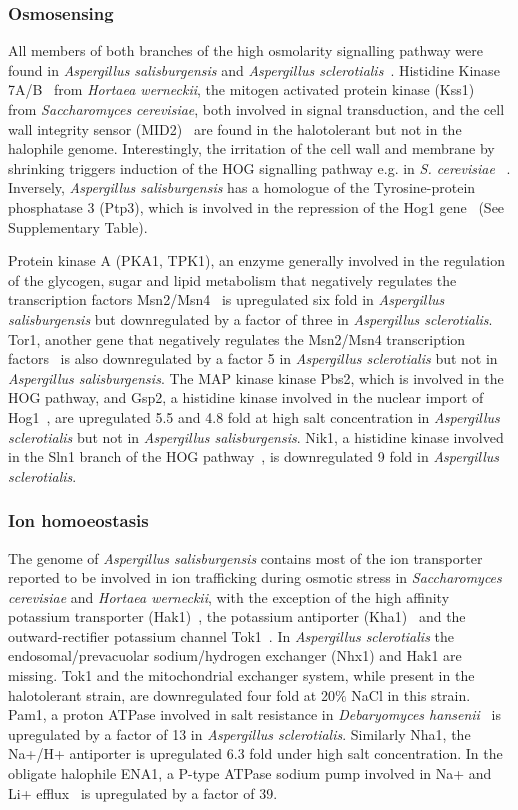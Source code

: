 \documentclass[jof,article,submit,moreauthors,pdftex,10pt,a4paper]{Definitions/mdpi}
\newcommand{\horWer}{\textit{Hortaea werneckii}}
\newcommand{\debHan}{\textit{Debaryomyces hansenii}}
\newcommand{\sacCer}{\textit{Saccharomyces cerevisiae}}
\newcommand{\phiSp}{\textit{Aspergillus salisburgensis}}
\newcommand{\phiScl}{\textit{Aspergillus sclerotialis}}
\begin{document}
\subsubsection{Osmosensing}
All members of both branches of the high osmolarity signalling pathway were found in \phiSp{} and \phiScl{}~\cite{Hohmann2009,Ma2013}. Histidine Kinase 7A/B~\cite{Lenassi2007} from \horWer{}, the mitogen activated protein kinase (Kss1)~\cite{Mortimer1989} from \sacCer{}, both involved in signal transduction,  and the cell wall integrity sensor (MID2)~\cite{Ono1994} are found in the halotolerant but not in the halophile genome. Interestingly, the irritation of the cell wall and membrane by shrinking  triggers induction of the HOG signalling pathway e.g. in \textit{S. cerevisiae} ~\cite{Hohmann2002, Stratford2019}. Inversely, \phiSp{} has a homologue of the  Tyrosine-protein phosphatase 3 (Ptp3), which is involved in the repression of the Hog1 gene~\cite{Wurgler-Murphy1997} (See Supplementary Table).

Protein kinase A (PKA1, TPK1), an enzyme generally involved in the regulation of the glycogen, sugar and lipid metabolism that negatively regulates the transcription factors Msn2/Msn4~\cite{Smith1998} is upregulated six fold in \phiSp{} but downregulated by a factor of three in \phiScl{}. Tor1, another gene that negatively regulates the Msn2/Msn4 transcription factors~\cite{Smith1998} is also downregulated by a factor 5 in \phiScl{} but not in \phiSp{}. The MAP kinase kinase Pbs2, which is involved in the HOG pathway, and Gsp2, a histidine kinase involved in the nuclear import of Hog1~\cite{Ferrigno1998}, are upregulated 5.5 and 4.8 fold at high salt concentration in \phiScl{} but not in \phiSp{}. Nik1, a histidine kinase involved in the Sln1 branch of the HOG pathway~\cite{Kruppa2006}, is downregulated 9 fold in \phiScl{}.

\subsubsection{Ion homoeostasis}
The genome of \phiSp{} contains most of the ion transporter reported to be involved in ion trafficking during osmotic stress in \sacCer{} and \horWer{}, with the exception of the high affinity potassium transporter (Hak1)~\cite{Kruppa2006}, the potassium antiporter (Kha1)~\cite{Plemenitas2014} and the outward-rectifier potassium channel Tok1~\cite{Plemenitas2014}. In \phiScl{} the endosomal/prevacuolar sodium/hydrogen exchanger (Nhx1) and Hak1 are missing. Tok1 and the mitochondrial exchanger system, while present in the halotolerant strain, are downregulated  four fold  at 20$\%$ NaCl in this strain. Pam1, a proton ATPase involved in salt resistance in \debHan{}~\cite{Prista2005} is upregulated by a factor of 13 in \phiScl{}. Similarly Nha1, the Na+/H+ antiporter is upregulated 6.3 fold under high salt concentration. In the obligate halophile ENA1, a  P-type ATPase sodium pump involved in Na+ and Li+ efflux~\cite{Haro1991} is upregulated by a factor of 39. 
\end{document}
